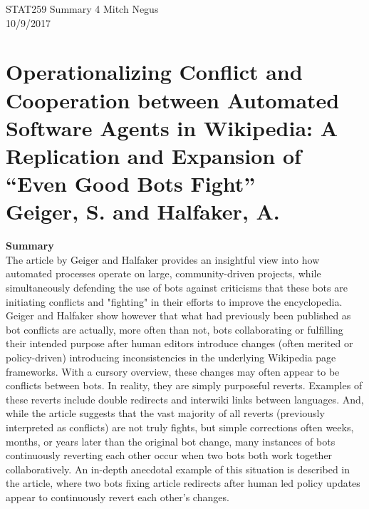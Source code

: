 \documentclass{report}
\newcommand{\tab}{\-\hspace{1cm}}
\begin{document}
\thispagestyle{empty}
\sffamily

\large {STAT259 Summary {4} \hfill Mitch Negus\\
		\hspace*{\fill} 10/9/2017\\ }
\section*{\textsf{Operationalizing Conflict and Cooperation between Automated Software Agents in Wikipedia: A Replication and Expansion of “Even Good Bots Fight” \\ \normalsize Geiger, S. and Halfaker, A.}}

\textbf{Summary}\\
\tab The article by Geiger and Halfaker provides an insightful view into how automated processes operate on large, community-driven projects, while simultaneously defending the use of bots against criticisms that these bots are initiating conflicts and "fighting" in their efforts to improve the encyclopedia. Geiger and Halfaker show however that what had previously been published as bot conflicts are actually, more often than not, bots collaborating or fulfilling their intended purpose after human editors introduce changes (often merited or policy-driven) introducing inconsistencies in the underlying Wikipedia page frameworks. With a cursory overview, these changes may often appear to be conflicts between bots. In reality, they are simply purposeful reverts. Examples of these reverts include double redirects and interwiki links between languages. And, while the article suggests that the vast majority of all reverts (previously interpreted as conflicts) are not truly fights, but simple corrections often weeks, months, or years later than the original bot change, many instances of bots continuously reverting each other occur when two bots both work together collaboratively. An in-depth anecdotal example of this situation is described in the article, where two bots fixing article redirects after human led policy updates appear to continuously revert each other's changes.
\end{document}
